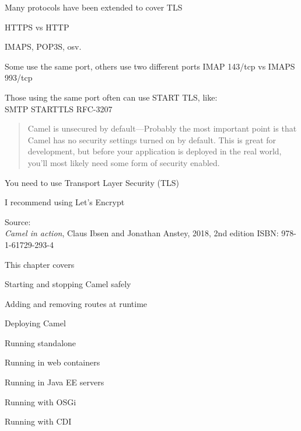 \documentclass[Screen16to9,17pt]{foils}
\begin{document}

\begin{list2}
\item Many protocols have been extended to cover TLS
\item HTTPS vs HTTP
\item IMAPS, POP3S, osv.
\item Some use the same port, others use two different ports IMAP 143/tcp vs IMAPS 993/tcp
\item Those using the same port often can use START TLS, like:\\
SMTP STARTTLS RFC-3207
\end{list2}





\begin{quote}
  Camel is unsecured by default—Probably the most important point is that Camel
  has no security settings turned on by default. This is great for development, but
  before your application is deployed in the real world, you’ll most likely need
  some form of security enabled.
\end{quote}

\begin{list2}
  \item You need to use Transport Layer Security (TLS)
  \item I recommend using Let's Encrypt 
\end{list2}

Source: {\footnotesize\\
\emph{Camel in action}, Claus Ibsen and Jonathan Anstey, 2018, 2nd edition
ISBN: 978-1-61729-293-4}




This chapter covers
\begin{list2}
\item Starting and stopping Camel safely
\item Adding and removing routes at runtime
\item Deploying Camel
\item Running standalone
\item Running in web containers
\item Running in Java EE servers
\item Running with OSGi
\item Running with CDI
\end{list2}
\end{document}
